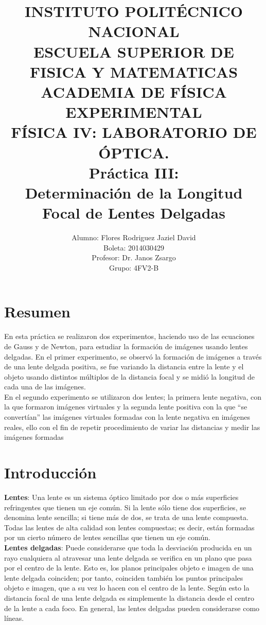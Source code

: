 \documentclass[13,twocolumn,letterpaper]{article}
\title{
    		\usefont{OT1}{bch}{b}{n}
    		\normalfont \normalsize \textsc{INSTITUTO POLITÉCNICO NACIONAL \\ 
    		ESCUELA SUPERIOR DE FISICA Y MATEMATICAS \\
    		ACADEMIA DE FÍSICA EXPERIMENTAL} \\ 
    	 FÍSICA IV: LABORATORIO DE ÓPTICA. \\[10pt]
    		\huge Práctica III: \\
    	Determinación de la Longitud Focal de Lentes Delgadas \\
    }
\author[0]{Alumno: Flores Rodriguez Jaziel David \\
    Boleta: 2014030429 \\
    Profesor: Dr. Janos Zsargo\\
    Grupo: 4FV2-B \\
            }
\begin{document}
    \maketitle
    
    
    \section*{Resumen}
    
    En esta práctica se realizaron dos experimentos, haciendo uso de las ecuaciones de Gauss y de Newton, para estudiar la formación de imágenes usando lentes delgadas. 
    En el primer experimento, se observó la formación de imágenes a través de una lente
    delgada positiva, se fue variando la distancia entre la lente y el objeto usando
    distintos múltiplos de la distancia focal y se midió la longitud de cada una de las
    imágenes. \\
    En el segundo experimento se utilizaron dos lentes; la primera lente negativa, con la
    que formaron imágenes virtuales y la segunda lente positiva con la que “se convertían”
    las imágenes virtuales formadas con la lente negativa en imágenes reales, ello
    con el fin de repetir procedimiento de variar las distancias y medir las imágenes
    formadas
    
    
    \section*{Introducción}
    
    \textbf{Lentes}: Una lente es un sistema óptico limitado por dos o más superficies
    refringentes que tienen un eje común. Si la lente sólo tiene dos superficies,
    se denomina lente sencilla; si tiene más de dos, se trata de una lente
    compuesta.
    Todas las lentes de alta calidad son lentes compuestas; es decir, están
    formadas por un cierto número de lentes sencillas que tienen un eje
    común. \\
    \textbf{Lentes delgadas}:
    Puede considerarse que toda la desviación producida en
    un rayo cualquiera al atravesar una lente delgada se verifica en un plano
    que pasa por el centro de la lente. Esto es, los planos principales objeto
    e imagen de una lente delgada coinciden; por tanto, coinciden también
    los puntos principales objeto e imagen, que a su vez lo hacen con el centro
    de la lente. Según esto la distancia focal de una lente delgada es
    simplemente la distancia desde el centro de la lente a cada foco.
    En general, las lentes delgadas pueden considerarse como líneas.
    
\end{document}
